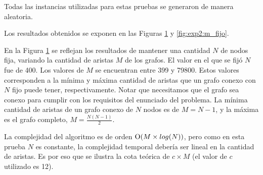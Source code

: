    Todas las instancias utilizadas para estas pruebas se generaron de manera aleatoria.

    Los resultados obtenidos se exponen en las Figuras \ref{fig:exp2:n_fijo} y \ref{fig:exp2:m_fijo}.

    \renewcommand\constante{12}

    En la Figura \ref{fig:exp2:n_fijo} se reflejan los resultados de mantener una cantidad $N$ de nodos fija, variando la cantidad de aristas $M$ de los grafos. El valor en el que se fijó $N$ fue de 400. Los valores de $M$ se encuentran entre 399 y 79800. Estos valores corresponden a la mínima y máxima cantidad de aristas que un grafo conexo con $N$ fijo puede tener, respectivamente. Notar que necesitamos que el grafo sea conexo para cumplir con los requisitos del enunciado del problema. La mínima cantidad de aristas de un grafo conexo de $N$ nodos es de $M = N - 1$, y la máxima es el grafo completo, $M = \frac{N(N - 1)}{2}$.

    La complejidad del algoritmo es de orden $\operatorname{O}(M \times log(N))$, pero como en esta prueba $N$ es constante, la complejidad temporal debería ser lineal en la cantidad de aristas. Es por eso que se ilustra la cota teórica de $c \times M$ (el valor de $c$ utilizado es \constante).

    \begin{figure}[H]
        \centering
        \caption{}
        \label{fig:exp2:n_fijo}
    \end{figure}

